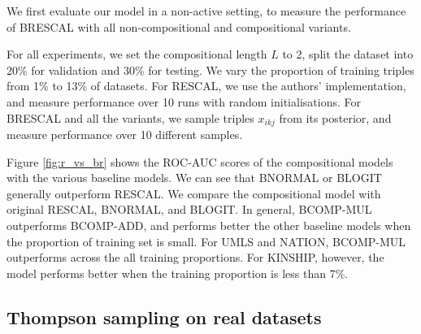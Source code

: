 We first evaluate our model in a non-active setting, 
to measure the performance of BRESCAL with all non-compositional and compositional variants.

For all experiments, we set the compositional length $L$ to 2, split the dataset into 20\% for validation and 30\% for testing. We vary the proportion of training triples
from 1\% to 13\% of datasets. For RESCAL, we use the authors' implementation, and measure performance over 10 runs with random initialisations. For BRESCAL and all the variants, we sample triples $x_{ikj}$ from its posterior, and measure performance over 10 different samples.

Figure \ref{fig:r_vs_br} shows the ROC-AUC scores of the compositional models with the various baseline models. We can see that BNORMAL or BLOGIT generally outperform RESCAL. We compare the compositional model with original RESCAL, BNORMAL, and BLOGIT. In general, BCOMP-MUL outperforms BCOMP-ADD, and performs better the other baseline models when the proportion of training set is small. For UMLS and NATION, BCOMP-MUL outperforms across the all training proportions. For KINSHIP, however, the model performs better when the training proportion is less than 7\%.


\subsection{Thompson sampling on real datasets}

